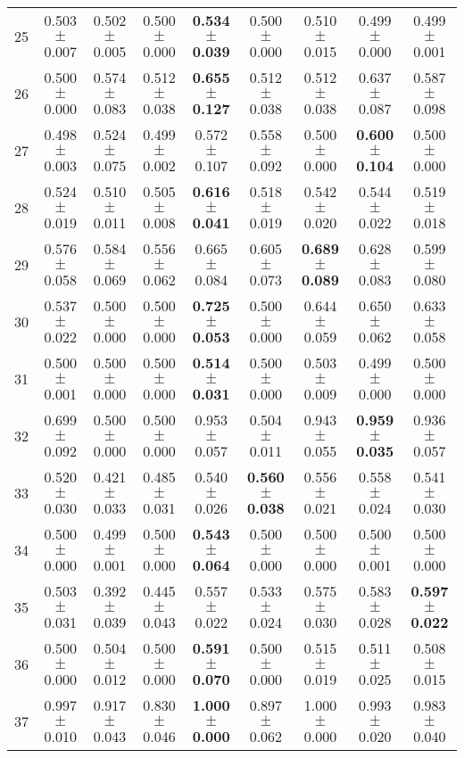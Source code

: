 \begin{table}[!ht]
{\begin{tabular}{r c c c c c c c c}
25 & 0.503 $\pm$ 0.007 & 0.502 $\pm$ 0.005 & 0.500 $\pm$ 0.000 & \textbf{0.534 $\pm$ 0.039} & 0.500 $\pm$ 0.000 & 0.510 $\pm$ 0.015 & 0.499 $\pm$ 0.000 & 0.499 $\pm$ 0.001 \\
26 & 0.500 $\pm$ 0.000 & 0.574 $\pm$ 0.083 & 0.512 $\pm$ 0.038 & \textbf{0.655 $\pm$ 0.127} & 0.512 $\pm$ 0.038 & 0.512 $\pm$ 0.038 & 0.637 $\pm$ 0.087 & 0.587 $\pm$ 0.098 \\
27 & 0.498 $\pm$ 0.003 & 0.524 $\pm$ 0.075 & 0.499 $\pm$ 0.002 & 0.572 $\pm$ 0.107 & 0.558 $\pm$ 0.092 & 0.500 $\pm$ 0.000 & \textbf{0.600 $\pm$ 0.104} & 0.500 $\pm$ 0.000 \\
28 & 0.524 $\pm$ 0.019 & 0.510 $\pm$ 0.011 & 0.505 $\pm$ 0.008 & \textbf{0.616 $\pm$ 0.041} & 0.518 $\pm$ 0.019 & 0.542 $\pm$ 0.020 & 0.544 $\pm$ 0.022 & 0.519 $\pm$ 0.018 \\
29 & 0.576 $\pm$ 0.058 & 0.584 $\pm$ 0.069 & 0.556 $\pm$ 0.062 & 0.665 $\pm$ 0.084 & 0.605 $\pm$ 0.073 & \textbf{0.689 $\pm$ 0.089} & 0.628 $\pm$ 0.083 & 0.599 $\pm$ 0.080 \\
30 & 0.537 $\pm$ 0.022 & 0.500 $\pm$ 0.000 & 0.500 $\pm$ 0.000 & \textbf{0.725 $\pm$ 0.053} & 0.500 $\pm$ 0.000 & 0.644 $\pm$ 0.059 & 0.650 $\pm$ 0.062 & 0.633 $\pm$ 0.058 \\
31 & 0.500 $\pm$ 0.001 & 0.500 $\pm$ 0.000 & 0.500 $\pm$ 0.000 & \textbf{0.514 $\pm$ 0.031} & 0.500 $\pm$ 0.000 & 0.503 $\pm$ 0.009 & 0.499 $\pm$ 0.000 & 0.500 $\pm$ 0.000 \\
32 & 0.699 $\pm$ 0.092 & 0.500 $\pm$ 0.000 & 0.500 $\pm$ 0.000 & 0.953 $\pm$ 0.057 & 0.504 $\pm$ 0.011 & 0.943 $\pm$ 0.055 & \textbf{0.959 $\pm$ 0.035} & 0.936 $\pm$ 0.057 \\
33 & 0.520 $\pm$ 0.030 & 0.421 $\pm$ 0.033 & 0.485 $\pm$ 0.031 & 0.540 $\pm$ 0.026 & \textbf{0.560 $\pm$ 0.038} & 0.556 $\pm$ 0.021 & 0.558 $\pm$ 0.024 & 0.541 $\pm$ 0.030 \\
34 & 0.500 $\pm$ 0.000 & 0.499 $\pm$ 0.001 & 0.500 $\pm$ 0.000 & \textbf{0.543 $\pm$ 0.064} & 0.500 $\pm$ 0.000 & 0.500 $\pm$ 0.000 & 0.500 $\pm$ 0.001 & 0.500 $\pm$ 0.000 \\
35 & 0.503 $\pm$ 0.031 & 0.392 $\pm$ 0.039 & 0.445 $\pm$ 0.043 & 0.557 $\pm$ 0.022 & 0.533 $\pm$ 0.024 & 0.575 $\pm$ 0.030 & 0.583 $\pm$ 0.028 & \textbf{0.597 $\pm$ 0.022} \\
36 & 0.500 $\pm$ 0.000 & 0.504 $\pm$ 0.012 & 0.500 $\pm$ 0.000 & \textbf{0.591 $\pm$ 0.070} & 0.500 $\pm$ 0.000 & 0.515 $\pm$ 0.019 & 0.511 $\pm$ 0.025 & 0.508 $\pm$ 0.015 \\
37 & 0.997 $\pm$ 0.010 & 0.917 $\pm$ 0.043 & 0.830 $\pm$ 0.046 & \textbf{1.000 $\pm$ 0.000} & 0.897 $\pm$ 0.062 & 1.000 $\pm$ 0.000 & 0.993 $\pm$ 0.020 & 0.983 $\pm$ 0.040 \\

\end{tabular}}
\end{table}
